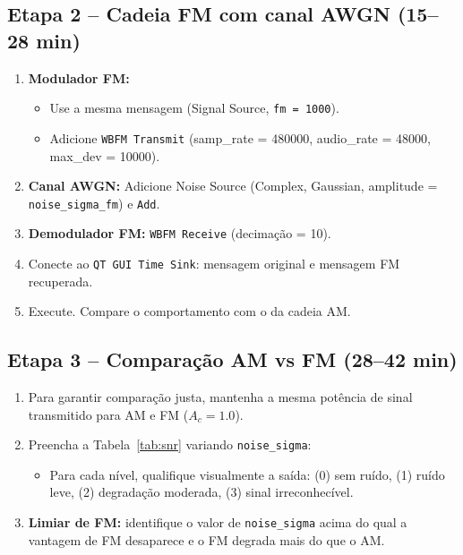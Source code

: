 \documentclass[11pt,a4paper]{article}
\begin{document}
\subsection*{Etapa 2 -- Cadeia FM com canal AWGN (15--28 min)}

\begin{instrucao}
\begin{enumerate}[label=\arabic*.]
  \item \textbf{Modulador FM:}
    \begin{itemize}
      \item Use a mesma mensagem (Signal Source, \texttt{fm = 1000}).
      \item Adicione \texttt{WBFM Transmit} (samp\_rate = 480000,
        audio\_rate = 48000, max\_dev = 10000).
    \end{itemize}
  \item \textbf{Canal AWGN:}
    Adicione Noise Source (Complex, Gaussian, amplitude = \texttt{noise\_sigma\_fm})
    e \texttt{Add}.
  \item \textbf{Demodulador FM:}
    \texttt{WBFM Receive} (decimação = 10).
  \item Conecte ao \texttt{QT GUI Time Sink}: mensagem original e
    mensagem FM recuperada.
  \item Execute. Compare o comportamento com o da cadeia AM.
\end{enumerate}
\end{instrucao}

\subsection*{Etapa 3 -- Comparação AM vs FM (28--42 min)}

\begin{instrucao}
\begin{enumerate}[label=\arabic*.]
  \item Para garantir comparação justa, mantenha a mesma potência de
    sinal transmitido para AM e FM ($A_c = 1.0$).
  \item Preencha a Tabela~\ref{tab:snr} variando \texttt{noise\_sigma}:
    \begin{itemize}
      \item Para cada nível, qualifique visualmente a saída:
        (0) sem ruído, (1) ruído leve, (2) degradação moderada,
        (3) sinal irreconhecível.
    \end{itemize}
  \item \textbf{Limiar de FM:} identifique o valor de \texttt{noise\_sigma}
    acima do qual a vantagem de FM desaparece e o FM degrada mais do que o AM.
\end{enumerate}
\end{instrucao}
\end{document}
